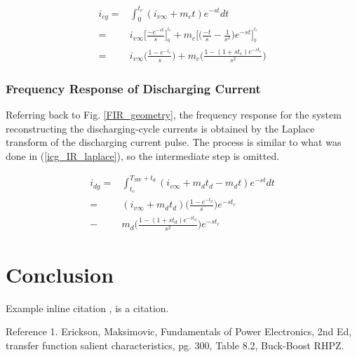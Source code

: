 \documentclass[conference]{IEEEtran}
\begin{document}
\begin{align}
i_{cg} =& \int_0^{t_c}(i_{v\infty} + m_c t)e^{-st}dt \nonumber \\
	   =& i_{v\infty}\bigg[ \frac{-e^{-st}}{s} \bigg]^{\stackrel{t_c}{}} _{\stackrel{0}{}}
	   + m_c\bigg[ \bigg( \frac{-t}{s} - \frac{1}{s^2} \bigg) e^{-st} \bigg]^{\stackrel{t_c}{}} _{\stackrel{0}{}} \nonumber \\
	   =&  i_{v\infty} \bigg( \frac{1 - e^{-t_c}}{s} \bigg)
	   + m_c\bigg( \frac{1 - (1 + st_c)e^{-st_c}}{s^2} \bigg)
	   \label{icg_IR_laplace}
\end{align}

\subsubsection{Frequency Response of Discharging Current}
Referring back to Fig. \ref{FIR_geometry}, the frequency response for the system reconstructing the discharging-cycle currents is obtained by the Laplace transform of the discharging current pulse.  The process is similar to what was done in (\ref{icg_IR_laplace}), so the intermediate step is omitted.

\begin{align}
i_{dg} =& \int_{t_c}^{T_{SW}+t_d}(i_{v\infty} 
+ m_d t_d - m_d t) e^{-st}dt \nonumber \\
 = & (i_{v\infty} +m_d t_d) \bigg( \frac{1 - e^{-t_d}}{s} \bigg)  e^{-st_c} \nonumber \\
- & m_d \bigg( \frac{1 - (1 + st_d)e^{-st_d}}{s^2} \bigg)  e^{-st_c}
\label{idg_IR_laplace}
\end{align}


\section{Conclusion}

Example inline citation
\cite{b1}, is a citation.


\begin{thebibliography}{00}
 Reference 1.
 Erickson, Maksimovic, Fundamentals of Power Electronics, 2nd Ed, transfer function salient characteristics, pg. 300, Table 8.2, Buck-Boost RHPZ.
\end{thebibliography}
\end{document}
